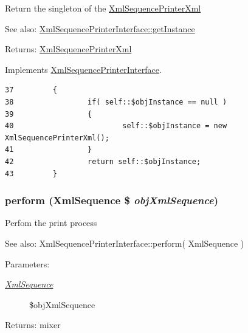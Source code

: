 Return the singleton of the \hyperlink{class_xml_sequence_printer_xml}{XmlSequencePrinterXml}

\begin{Desc}
\item[See also:]\hyperlink{interface_xml_sequence_printer_interface_c93fbec81f07e5d15f80db907e63dc10}{XmlSequencePrinterInterface::getInstance} \end{Desc}
\begin{Desc}
\item[Returns:]\hyperlink{class_xml_sequence_printer_xml}{XmlSequencePrinterXml} \end{Desc}


Implements \hyperlink{interface_xml_sequence_printer_interface_c93fbec81f07e5d15f80db907e63dc10}{XmlSequencePrinterInterface}.

\begin{Code}\begin{verbatim}37         {
38                 if( self::$objInstance == null )
39                 {
40                         self::$objInstance = new XmlSequencePrinterXml();
41                 }
42                 return self::$objInstance;
43         }
\end{verbatim}
\end{Code}


\hypertarget{class_xml_sequence_printer_xml_7a8a4630e9f25847da0a6de87a5ab7e0}{
\subsubsection[{perform}]{\setlength{\rightskip}{0pt plus 5cm}perform ({\bf XmlSequence} \$ {\em objXmlSequence})}}
\label{class_xml_sequence_printer_xml_7a8a4630e9f25847da0a6de87a5ab7e0}


Perfom the print process

\begin{Desc}
\item[See also:]XmlSequencePrinterInterface::perform( XmlSequence ) \end{Desc}
\begin{Desc}
\item[Parameters:]
\begin{description}
\item[{\em \hyperlink{class_xml_sequence}{XmlSequence}}]\$objXmlSequence \end{description}
\end{Desc}
\begin{Desc}
\item[Returns:]mixer \end{Desc}


